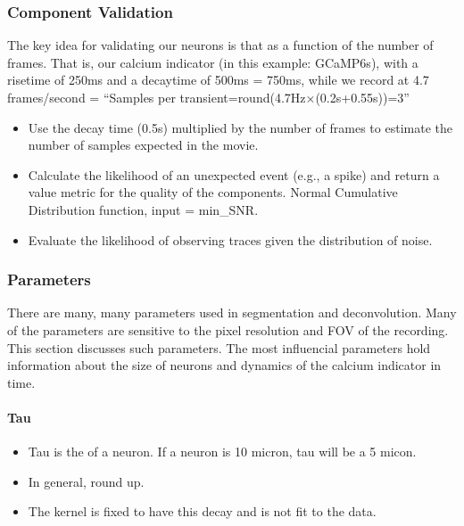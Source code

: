 \documentclass[letterpaper,10pt,english]{sphinxmanual}
\begin{document}
\subsubsection{Component Validation}
\label{\detokenize{user_guide/segmentation:component-validation}}
\sphinxAtStartPar
The key idea for validating our neurons is that  as a function
of the number of frames. That is, our calcium indicator (in this example: GCaMP\sphinxhyphen{}6s), with a rise\sphinxhyphen{}time of 250ms and a decay\sphinxhyphen{}time of 500ms = 750ms, while we
record at 4.7 frames/second = “Samples per transient=round(4.7Hz×(0.2s+0.55s))=3”
\begin{itemize}
\item {} 
\sphinxAtStartPar
Use the decay time (0.5s) multiplied by the number of frames to estimate the number of samples expected in the movie.

\item {} 
\sphinxAtStartPar
Calculate the likelihood of an unexpected event (e.g., a spike) and return a value metric for the quality of the components.
\sphinxhyphen{} Normal Cumulative Distribution function, input = \sphinxhyphen{}min\_SNR.

\item {} 
\sphinxAtStartPar
Evaluate the likelihood of observing traces given the distribution of noise.

\end{itemize}


\subsubsection{Parameters}
\label{\detokenize{user_guide/segmentation:parameters}}
\sphinxAtStartPar
There are many, many parameters used in segmentation and deconvolution. Many of the parameters are sensitive to the  pixel resolution and FOV of the recording. This section discusses such parameters.
The most influencial parameters hold information about the size of neurons and dynamics of the calcium indicator in time.


\paragraph{Tau}
\label{\detokenize{user_guide/segmentation:tau}}\begin{itemize}
\item {} 
\sphinxAtStartPar
Tau is the  of a neuron. If a neuron is 10 micron, tau will be a 5 micon.

\item {} 
\sphinxAtStartPar
In general, round up.

\item {} 
\sphinxAtStartPar
The kernel is fixed to have this decay and is not fit to the data.

\end{itemize}
\end{document}
